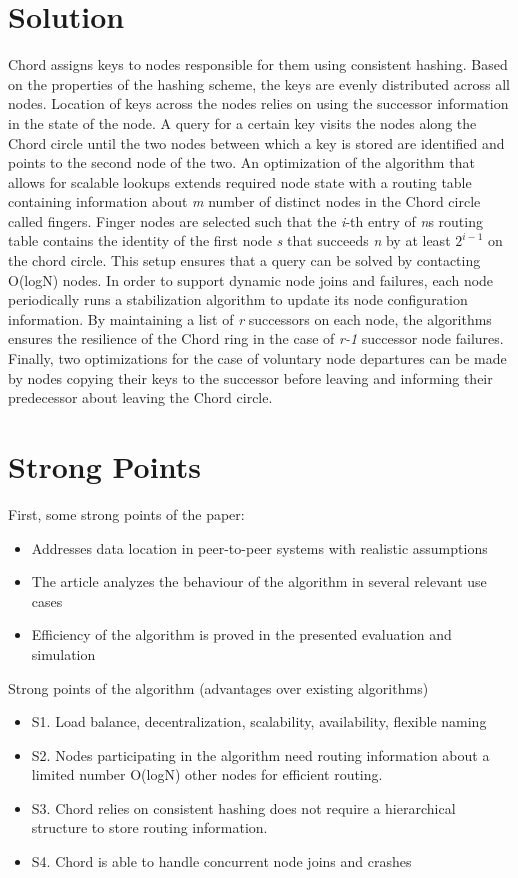 \documentclass[10pt]{proc}
\begin{document}
\section{Solution}
Chord assigns keys to nodes responsible for them using consistent hashing. 
Based on the properties of the hashing scheme, the keys are evenly distributed across all nodes. 
Location of keys across the nodes relies on using the successor information in the state of the node. 
A query for a certain key visits the nodes along the Chord circle until the two nodes between which a key is stored are identified and points to the second node of the two. 
An optimization of the algorithm that allows for scalable lookups extends required node state with a routing table containing information about \emph{m} number of distinct nodes in the Chord circle called fingers. 
Finger nodes are selected such that the \emph{i}-th entry of \emph{n}s routing table contains the identity of the first node \emph{s} that succeeds \emph{n} by at least $2^{i-1}$ on the chord circle. 
This setup ensures that a query can be solved by contacting O(logN) nodes.
In order to support dynamic node joins and failures, each node periodically runs a stabilization algorithm to update its node configuration information. 
By maintaining a list of \emph{r} successors on each node, the algorithms ensures the resilience of the Chord ring in the case of \emph{r-1} successor node failures. 
Finally, two optimizations for the case of voluntary node departures can be made by nodes copying their keys to the successor before leaving and informing their predecessor about leaving the Chord circle. 

\section{Strong Points}
First, some strong points of the paper:
\begin{itemize}
\item Addresses data location in peer-to-peer systems with realistic assumptions
\item The article analyzes the behaviour of the algorithm in several relevant use cases
\item Efficiency of the algorithm is proved in the presented evaluation and simulation
\end{itemize}

Strong points of the algorithm (advantages over existing algorithms)

\begin{itemize}
 \item S1. Load balance, decentralization, scalability, availability, flexible naming
 \item S2. Nodes participating in the algorithm need routing information about a limited number O(logN) other nodes for efficient routing.
 \item S3. Chord relies on consistent hashing does not require a hierarchical structure to store routing information.
 \item S4. Chord is able to handle concurrent node joins and crashes
\end{itemize}
\end{document}
